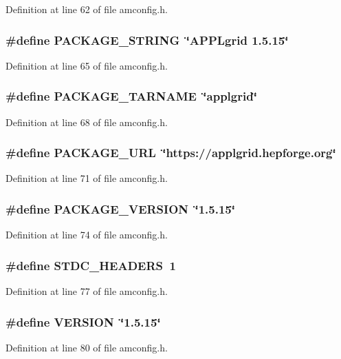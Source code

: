 Definition at line 62 of file amconfig.h.
\subsubsection[{PACKAGE\_\-STRING}]{\setlength{\rightskip}{0pt plus 5cm}\#define PACKAGE\_\-STRING~\char`\"{}APPLgrid 1.5.15\char`\"{}}\label{amconfig_8h_ac73e6f903c16eca7710f92e36e1c6fbf}


Definition at line 65 of file amconfig.h.
\subsubsection[{PACKAGE\_\-TARNAME}]{\setlength{\rightskip}{0pt plus 5cm}\#define PACKAGE\_\-TARNAME~\char`\"{}applgrid\char`\"{}}\label{amconfig_8h_af415af6bfede0e8d5453708afe68651c}


Definition at line 68 of file amconfig.h.
\subsubsection[{PACKAGE\_\-URL}]{\setlength{\rightskip}{0pt plus 5cm}\#define PACKAGE\_\-URL~\char`\"{}https://applgrid.hepforge.org\char`\"{}}\label{amconfig_8h_a5c93853116d5a50307b6744f147840aa}


Definition at line 71 of file amconfig.h.
\subsubsection[{PACKAGE\_\-VERSION}]{\setlength{\rightskip}{0pt plus 5cm}\#define PACKAGE\_\-VERSION~\char`\"{}1.5.15\char`\"{}}\label{amconfig_8h_aa326a05d5e30f9e9a4bb0b4469d5d0c0}


Definition at line 74 of file amconfig.h.
\subsubsection[{STDC\_\-HEADERS}]{\setlength{\rightskip}{0pt plus 5cm}\#define STDC\_\-HEADERS~1}\label{amconfig_8h_a550e5c272cc3cf3814651721167dcd23}


Definition at line 77 of file amconfig.h.
\subsubsection[{VERSION}]{\setlength{\rightskip}{0pt plus 5cm}\#define VERSION~\char`\"{}1.5.15\char`\"{}}\label{amconfig_8h_a1c6d5de492ac61ad29aec7aa9a436bbf}


Definition at line 80 of file amconfig.h.